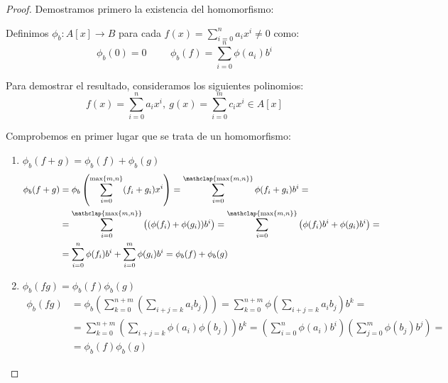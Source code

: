 \begin{proof}
    Demostramos primero la existencia del homomorfismo:

    
    Definimos $\phi_b:A[x]\longrightarrow B$ para cada $f(x) = \sum\limits_{i=0}^n a_i x^i \neq 0$ como:
    \begin{equation*}
        \phi_b(0) = 0 \hspace{1cm} \phi_b(f) = \sum_{i=0}^n \phi(a_i)b^i
    \end{equation*}
    
    Para demostrar el resultado, consideramos los siguientes polinomios: $$f(x) = \sum_{i=0}^n a_i x^i, ~g(x)=\sum_{i=0}^m c_i x^i \in A[x]$$

    Comprobemos en primer lugar que se trata de un homomorfismo:
    \begin{enumerate}
        \item $\phi_b(f+g) = \phi_b(f) + \phi_b(g)$
        \begin{equation*}
            \begin{split}
                \phi_b(f + g)
                &= \phi_b\left( \sum_{i=0}^{{\max\{m,n\}}} (f_i + g_i) x^i \right)
                =  \sum_{i=0}^{\mathclap{\max\{m,n\}}} \phi(f_i + g_i) b^i =\\
                &=\sum_{i=0}^{\mathclap{\max\{m,n\}}} \left( (\phi(f_i) + \phi(g_i)) b^i \right)
                = \sum_{i=0}^{\mathclap{\max\{m,n\}}} \left( \phi(f_i)b^i + \phi(g_i)b^i \right) =\\
                &= \sum_{i=0}^n \phi(f_i)b^i + \sum_{i=0}^m \phi(g_i)b^i
                = \phi_b(f) + \phi_b(g)
            \end{split}
        \end{equation*}

        \item $\phi_b(fg) = \phi_b(f)\phi_b(g)$
        \begin{equation*}
            \begin{split}
                \phi_b(fg)
                &= \phi_b\left( \sum_{k=0}^{n+m} \left( \sum_{i+j=k} a_i b_j \right) \right)
                = \sum_{k=0}^{n+m} \phi\left( \sum_{i+j=k} a_ib_j \right)b^k = \\
                &= \sum_{k=0}^{n+m}\left( \sum_{i+j=k} \phi(a_i)\phi(b_j) \right) b^k
                = \left( \sum_{i=0}^n \phi(a_i)b^i \right) \left( \sum_{j=0}^m \phi(b_j) b^j \right) =\\
                & = \phi_b(f)\phi_b(g)
            \end{split}
        \end{equation*}


\end{enumerate}
\end{proof}
